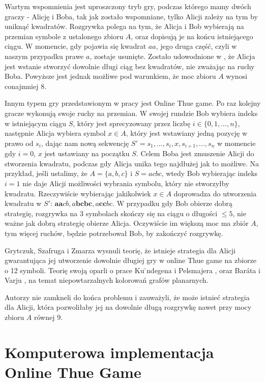 \documentclass[document]{xmgr}
\begin{document}
Wartym wspomnienia jest uproszczony tryb gry, podczas którego mamy dwóch graczy - Alicję i Boba, tak jak zostało wspomniane, tylko Alicji zależy na tym by uniknąć kwadratów. Rozgrywka polega na tym, że Alicja i Bob wybierają na przemian symbole z ustalonego zbioru $A$, oraz dopisują je na końcu istniejącego ciągu. W momencie, gdy pojawia się kwadrat $aa$, jego druga część, czyli w naszym przypadku prawe $a$, zostaje usunięte. Zostało udowodnione w \cite{thueonline2}, że Alicja jest wstanie stworzyć dowolnie długi ciąg bez kwadratów, nie zważając na ruchy Boba. Powyższe jest jednak możliwe pod warunkiem, że moc zbioru $A$ wynosi conajmniej $8$.

Innym typem gry przedstawionym w pracy \cite{thueonline} jest Online Thue game. Po raz  
kolejny gracze wykonują swoje ruchy na przemian. W swojej rundzie Bob wybiera indeks w istniejącym ciągu $S$, który jest sprecyzowany przez 
liczbę $i \in \{0, 1, ..., n\}$, następnie Alicja wybiera symbol $x \in A
$, który jest wstawiany jedną pozycję w prawo od $s_i$, dając nam nową sekwencję $S' = s_1, ..., s_i, x, s_{i+1}, ...,s_n$ w momencie gdy $i = 0$, $x$ jest ustawiany na początku $S$. Celem Boba jest zmuszenie Alicji do stworzenia kwadratu, podczas gdy Alicja unika tego najdłużej jak to możliwe. Na przykład, jeśli ustalimy, że $A = \{a, b, c\}$ i $S = acbc$, wtedy Bob wybierając indeks $i = 1$ nie daje Alicji możliwości wybrania symbolu, który nie stworzyłby kwadratu. Rzeczywiście wybierając jakikolwiek $x \in A$ doprowadza do utworzenia kwadratu w $S'$: $\textbf{aa}cb, a\textbf{bcbc}, a\textbf{cc}bc$. W przypadku gdy Bob obierze dobrą strategię, rozgrywka na 3 symbolach skończy się na ciągu o długości $\leq 5$, nie ważne jak dobrą strategię obierze Alicja. Oczywiście im większą moc ma zbiór $A$, tym więcej ruchów, będzie potrzebował Bob, by zakończyć rozgrywkę. 

Grytczuk, Szafruga i Zmarza \cite{thueonline} wysnuli teorię, że istnieje strategia dla Alicji gwarantująca jej utworzenie dowolnie długiej gry w online Thue game na zbiorze o 12 symboli. Teorię swoją oparli o prace Ku ̈ndegena i Pelsmajera \cite{first}, oraz Baráta i Varju \cite{second}, na temat niepowtarzalnych kolorowań grafów planarnych.

Autorzy \cite{thueonline} nie zamkneli do końca problemu i zauważyli, że może istnieć strategia dla Alicji, która pozwoliłaby jej na dowolnie długą rozgrywkę nawet przy mocy zbioru $A$ równej 9.


\section{Komputerowa implementacja Online Thue Game}
\end{document}
